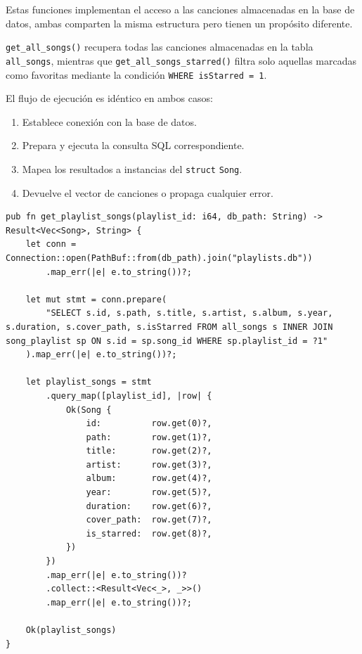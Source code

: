 \documentclass[11pt, a4paper]{article}
\begin{document}
            Estas funciones implementan el acceso a las canciones almacenadas en la base de datos, ambas comparten la misma estructura pero tienen un propósito diferente.

            \verb|get_all_songs()| recupera todas las canciones almacenadas en la tabla \verb|all_songs|, mientras que \verb|get_all_songs_starred()| filtra solo aquellas marcadas como favoritas mediante la condición \verb|WHERE isStarred = 1|.

            El flujo de ejecución es idéntico en ambos casos:
            \begin{enumerate}
              \item Establece conexión con la base de datos.
              \item Prepara y ejecuta la consulta SQL correspondiente.
              \item Mapea los resultados a instancias del \verb|struct| \verb|Song|.
              \item Devuelve el vector de canciones o propaga cualquier error.
            \end{enumerate}

            \begin{lstlisting}[caption={fn get\_playlist\_songs()}]
pub fn get_playlist_songs(playlist_id: i64, db_path: String) -> Result<Vec<Song>, String> {
    let conn = Connection::open(PathBuf::from(db_path).join("playlists.db"))
        .map_err(|e| e.to_string())?;

    let mut stmt = conn.prepare(
        "SELECT s.id, s.path, s.title, s.artist, s.album, s.year, s.duration, s.cover_path, s.isStarred FROM all_songs s INNER JOIN song_playlist sp ON s.id = sp.song_id WHERE sp.playlist_id = ?1"
    ).map_err(|e| e.to_string())?;

    let playlist_songs = stmt
        .query_map([playlist_id], |row| {
            Ok(Song {
                id:          row.get(0)?,
                path:        row.get(1)?,
                title:       row.get(2)?,
                artist:      row.get(3)?,
                album:       row.get(4)?,
                year:        row.get(5)?,
                duration:    row.get(6)?,
                cover_path:  row.get(7)?,
                is_starred:  row.get(8)?,
            })
        })
        .map_err(|e| e.to_string())?
        .collect::<Result<Vec<_>, _>>()
        .map_err(|e| e.to_string())?;

    Ok(playlist_songs)
}
            \end{lstlisting}
\end{document}
